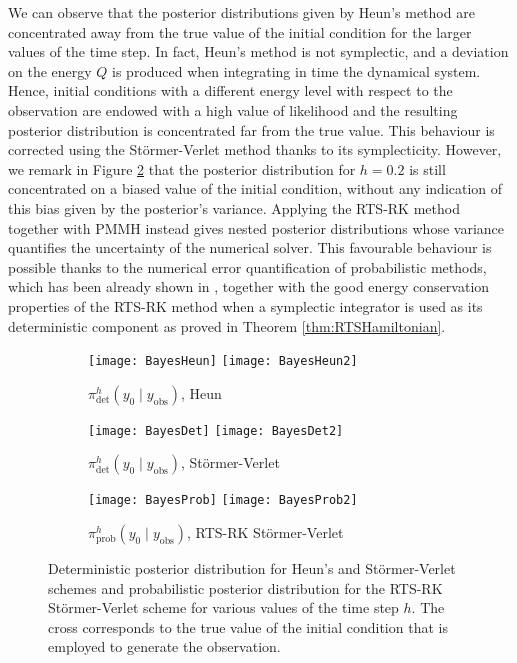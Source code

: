 \documentclass{siamart1116}
\numberwithin{theorem}{section}
\begin{document}
We can observe that the posterior distributions given by Heun's method are concentrated away from the true value of the initial condition for the larger values of the time step. In fact, Heun's method is not symplectic, and a deviation on the energy $Q$ is produced when integrating in time the dynamical system. Hence, initial conditions with a different energy level with respect to the observation are endowed with a high value of likelihood and the resulting posterior distribution is concentrated far from the true value. This behaviour is corrected using the Störmer-Verlet method thanks to its symplecticity. However, we remark in Figure \ref{fig:BayesB} that the posterior distribution for $h = 0.2$ is still concentrated on a biased value of the initial condition, without any indication of this bias given by the posterior's variance. Applying the RTS-RK method together with PMMH instead gives nested posterior distributions whose variance quantifies the uncertainty of the numerical solver. This favourable behaviour is possible thanks to the numerical error quantification of probabilistic methods, which has been already shown in \cite{AbG18, CGS16, COS17}, together with the good energy conservation properties of the RTS-RK method when a symplectic integrator is used as its deterministic component as proved in Theorem \ref{thm:RTSHamiltonian}.

\begin{figure}
\begin{subfigure}{\textwidth}
	\centering
	\texttt{[image: BayesHeun]}
	\texttt{[image: BayesHeun2]}
	\caption{$\pi^h_{\mathrm{det}}(y_0\mid y_{\mathrm{obs}})$, Heun}
	\label{fig:BayesA}
\end{subfigure}	
\begin{subfigure}{\textwidth}
	\centering
	\texttt{[image: BayesDet]}
	\texttt{[image: BayesDet2]}
	\caption{$\pi^h_{\mathrm{det}}(y_0\mid y_{\mathrm{obs}})$, Störmer-Verlet}
	\label{fig:BayesB}
\end{subfigure}
\begin{subfigure}{\textwidth}
	\centering
	\texttt{[image: BayesProb]}
	\texttt{[image: BayesProb2]}
	\caption{$\pi^h_{\mathrm{prob}}(y_0\mid y_{\mathrm{obs}})$, RTS-RK Störmer-Verlet}
	\label{fig:BayesC}
\end{subfigure}
\caption{Deterministic posterior distribution for Heun's and Störmer-Verlet schemes and probabilistic posterior distribution for the RTS-RK Störmer-Verlet scheme for various values of the time step $h$. The cross corresponds to the true value of the initial condition that is employed to generate the observation.}
\label{fig:Bayes}
\end{figure}
\end{document}
